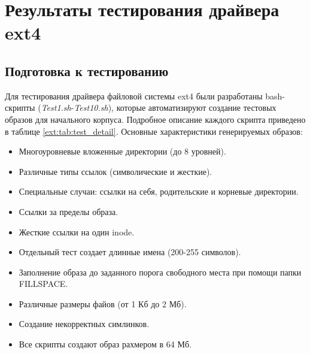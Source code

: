 \section{Результаты тестирования драйвера ext4}

\subsection{Подготовка к тестированию}
Для тестирования драйвера файловой системы ext4 были разработаны bash-скрипты (\textit{Test1.sh}-\textit{Test10.sh}), которые автоматизируют создание тестовых образов для начального корпуса. Подробное описание каждого скрипта приведено в таблице \ref{ext:tab:test_detail}. Основные характеристики генерируемых образов:
\begin{itemize}
	\item Многоуровневые вложенные директории (до 8 уровней).
	\item Различные типы ссылок (символические и жесткие).
	\item Специальные случаи: ссылки на себя, родительские и корневые директории.
	\item Ссылки за пределы образа.
	\item Жесткие ссылки на один inode.
	\item Отдельный тест создает длинные имена (200-255 символов).
	\item Заполнение образа до заданного порога свободного места при помощи папки FILLSPACE.
	\item Различные размеры файов (от 1 Кб до 2 Мб).
	\item Создание некорректных симлинков.
	\item Все скрипты создают образ рахмером в 64 Мб.
\end{itemize} 
